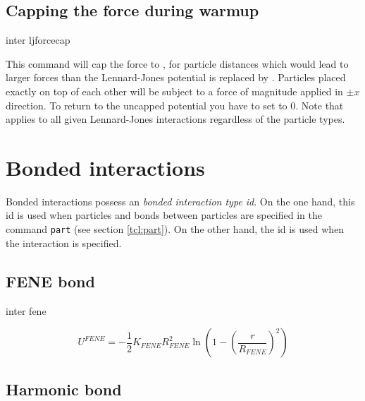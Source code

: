 \subsection{Capping the force during warmup}

\begin{essyntax}
  inter ljforcecap 
\end{essyntax}

This command will cap the force to , \ie for particle
distances which would lead to larger forces than  the
Lennard-Jones potential is replaced by . Particles
placed exactly on top of each other will be subject to a force of
magnitude  applied in $\pm x$ direction. To return to
the uncapped potential you have to set  to $0$.  Note
that  applies to all given Lennard-Jones
interactions regardless of the particle types.

\section{Bonded interactions}
\label{sec:inter-bonded}

 Bonded interactions possess an
\emph{bonded interaction type id}. On the one hand, this id is used
when particles and bonds between particles are specified in the
command \texttt{part} (see section \vref{tcl:part}).  On the other
hand, the id is used when the interaction is specified.

\subsection{FENE bond}

\begin{essyntax}
  inter  
  fene
   
\end{essyntax}

\[ U^{FENE} = -\frac{1}{2} K_{FENE} R_{FENE}^2 \ln \left( 1 - \left( \frac{r}{R_{FENE}} \right)^2 \right) \]

\subsection{Harmonic bond}

